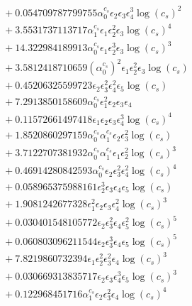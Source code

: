 \documentclass[10pt]{article}
\begin{document}
\begin{align*}
&{}  + 0.054709787799755 \alpha_{0}^{c_s} \epsilon_{2} \epsilon_{3} \epsilon_{4}^{3} \log{\left(c_{s} \right)}^{2} \\
&{}  + 3.5531737113717 \alpha_{1}^{c_s} \epsilon_{1} \epsilon_{2}^{2} \epsilon_{3} \log{\left(c_{s} \right)}^{4} \\
&{}  + 14.322984189913 \alpha_{0}^{c_s} \epsilon_{1} \epsilon_{2}^{3} \epsilon_{3} \log{\left(c_{s} \right)}^{3} \\
&{}  + 3.5812418710659 \left(\alpha_{0}^{c_s}\right)^{2} \epsilon_{1} \epsilon_{2}^{2} \epsilon_{3} \log{\left(c_{s} \right)} \\
&{}  + 0.45206325599723 \epsilon_{2} \epsilon_{3}^{2} \epsilon_{4}^{2} \epsilon_{5} \log{\left(c_{s} \right)} \\
&{}  + 7.2913850158609 \alpha_{0}^{c_s} \epsilon_{1}^{2} \epsilon_{2} \epsilon_{3} \epsilon_{4} \\
&{}  + 0.11572661497418 \epsilon_{1} \epsilon_{2} \epsilon_{3} \epsilon_{4}^{3} \log{\left(c_{s} \right)}^{4} \\
&{}  + 1.8520860297159 \alpha_{0}^{c_s} \alpha_{1}^{c_s} \epsilon_{2} \epsilon_{3}^{2} \log{\left(c_{s} \right)} \\
&{}  + 3.7122707381932 \alpha_{0}^{c_s} \alpha_{1}^{c_s} \epsilon_{1} \epsilon_{2}^{2} \log{\left(c_{s} \right)}^{3} \\
&{}  + 0.46914280842593 \alpha_{0}^{c_s} \epsilon_{2} \epsilon_{3}^{2} \epsilon_{4}^{2} \log{\left(c_{s} \right)}^{4} \\
&{}  + 0.058965375988161 \epsilon_{2}^{3} \epsilon_{3} \epsilon_{4} \epsilon_{5} \log{\left(c_{s} \right)} \\
&{}  + 1.9081242677328 \epsilon_{1}^{2} \epsilon_{2} \epsilon_{3} \epsilon_{4}^{2} \log{\left(c_{s} \right)}^{3} \\
&{}  + 0.030401548105772 \epsilon_{2} \epsilon_{3}^{2} \epsilon_{4} \epsilon_{5}^{2} \log{\left(c_{s} \right)}^{5} \\
&{}  + 0.060803096211544 \epsilon_{2} \epsilon_{3}^{3} \epsilon_{4} \epsilon_{5} \log{\left(c_{s} \right)}^{5} \\
&{}  + 7.8219860732394 \epsilon_{1} \epsilon_{2}^{2} \epsilon_{3}^{2} \epsilon_{4} \log{\left(c_{s} \right)}^{3} \\
&{}  + 0.030669313835717 \epsilon_{2} \epsilon_{3} \epsilon_{4}^{3} \epsilon_{5} \log{\left(c_{s} \right)}^{3} \\
&{}  + 0.122968451716 \alpha_{1}^{c_s} \epsilon_{2} \epsilon_{3}^{2} \epsilon_{4} \log{\left(c_{s} \right)}^{4} \\

\end{align*}
\end{document}
